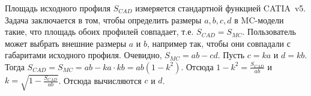 Площадь исходного профиля $S_{CAD}$ измеряется стандартной функцией CATIA~v5. Задача заключается в том, чтобы определить размеры $a, b, c, d$ в MC-модели такие, что площадь обоих профилей совпадает, т.е. $S_{CAD} = S_{MC}$. Пользователь может выбрать внешние размеры $a$ и $b$, например так, чтобы они совпадали с габаритами исходного профиля. Очевидно, $S_{MC} = ab - cd$. Пусть $c = ka$ и $d = kb$. Тогда $S_{CAD} = S_{MC} = ab - ka \cdot kb = ab(1 - k^2)$. Отсюда $1 - k^2 = \frac{S_{CAD}}{ab}$ и $k = \sqrt{1 - \frac{S_{CAD}}{ab}}$. Отсюда вычисляются $c$ и $d$.
